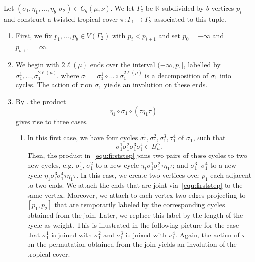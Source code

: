 \documentclass[10pt]{amsart}
\theoremstyle{plain}
\theoremstyle{definition}
\theoremstyle{definition}
\theoremstyle{plain}
\theoremstyle{plain}
\theoremstyle{remark}
\theoremstyle{plain}
\theoremstyle{plain}
\begin{document}
\begin{construction}
\label{con-twist}
Let $(\sigma_1,
\eta_1,\dots,\eta_b,\sigma_2)\in C_g(\mu,\nu)$. We let $\Gamma_2$ be $\mathbb{R}$ subdivided by $b$ vertices $p_i$ and construct a twisted tropical cover $\pi\colon\Gamma_1\to\Gamma_2$ associated to this tuple.

\begin{enumerate}
    \item First, we fix $p_1,\dots,p_b\in V(\Gamma_2)$ with $p_i<p_{i+1}$ and set $p_0=-\infty$ and $p_{b+1}=
    \infty$.
    \item We begin with $2\ell(\mu)$ ends over the interval $(-\infty,p_1]$, labelled by $\sigma_1^1,\dots,\sigma_1^{2\ell(\mu)}$, where $\sigma_1=\sigma_1^1\circ \ldots \circ \sigma_1^{2\ell(\mu)}$ is a decomposition of $\sigma_1$ into cycles. The action of $\tau$ on $\sigma_1$ yields an involution on these ends.
    \item By \cite[Theorem 2.14]{BF21}, the product
    \begin{equation}
    \label{equ:firststep}
        \eta_1\circ\sigma_1\circ(\tau\eta_1\tau) \tag{*}
    \end{equation}
    gives rise to three cases.
    \begin{enumerate}
        \item In this first case, we have four cycles $\sigma_1^1,\sigma_1^2,\sigma_1^3,\sigma_1^4$ of $\sigma_1$, such that
        \begin{equation*}
            \sigma_1^1\sigma_1^2\sigma_1^3\sigma_1^4\in B^{\sim}_n.
        \end{equation*}
        Then, the product in~\eqref{equ:firststep} joins two pairs of these cycles to two new cycles, e.g. $\sigma_1^1$, $\sigma_1^2$ to a new cycle $\eta_1\sigma_1^1\sigma_1^2\tau\eta_1\tau$; and $\sigma_1^3$, $\sigma_1^4$ to a new cycle $\eta_1\sigma_1^3\sigma_1^4\tau\eta_1\tau$.
        In this case, we create two vertices over $p_1$ each adjacent to two ends. We attach the ends that are joint via~\eqref{equ:firststep} to the same vertex. Moreover, we attach to each vertex two edges projecting to $[p_1,p_2]$ that are temporarily labeled by the corresponding cycles obtained from the join. Later, we replace this label by the length of the cycle as weight. This is illustrated in the following picture for the case that $\sigma_1^1$ is joined with $\sigma_1^2$ and $\sigma_1^3$ is joined with $\sigma_1^4$. Again, the action of $\tau$ on the permutation obtained from the join yields an involution of the tropical cover. 
        

\end{enumerate}
\end{enumerate}
\end{construction}
\end{document}
